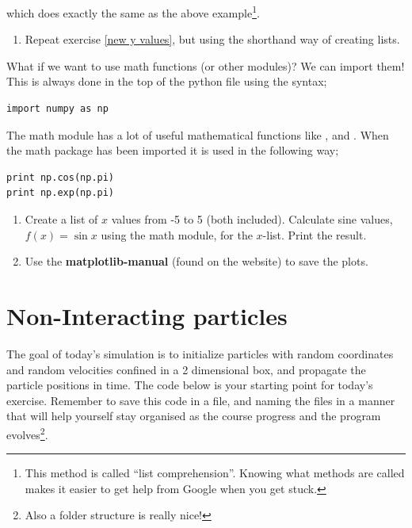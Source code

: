\documentclass{article}
\begin{document}
which does exactly the same as the above example\footnote{This method is called ``list comprehension''. Knowing what methods are called makes it easier to get help from Google when you get stuck.}.

\begin{enumerate}[resume]
    \item Repeat exercise \ref{new y values}, but using the shorthand way of creating lists.
\end{enumerate}

What if we want to use math functions (or other modules)?
We can import them! This is always done in the top of the
python file using the syntax;

\begin{lstlisting}
import numpy as np
\end{lstlisting}

The math module has a lot of useful mathematical functions like ,  and .
When the math package has been imported it is used in the following way;

\begin{lstlisting}
print np.cos(np.pi)
print np.exp(np.pi)
\end{lstlisting}

\begin{enumerate}[resume]
    \item Create a list of $x$ values from -5 to 5 (both included).
    Calculate sine values, $f(x) = \sin{x}$ using the math module,
    for the $x$-list.
    Print the result.
    \item Use the \textbf{matplotlib-manual} (found on the website) to save the plots.
\end{enumerate}

%
%
%

\newpage
\section{Non-Interacting particles}

The goal of today's simulation is to initialize particles with random coordinates and random velocities confined in a 2 dimensional box, and propagate the particle positions in time.
%
The code below is your starting point for today's exercise.
Remember to save this code in a  file, and naming the files in a manner that will help yourself stay organised as the course progress and the program evolves\footnote{Also a folder structure is really nice!}.
\end{document}
